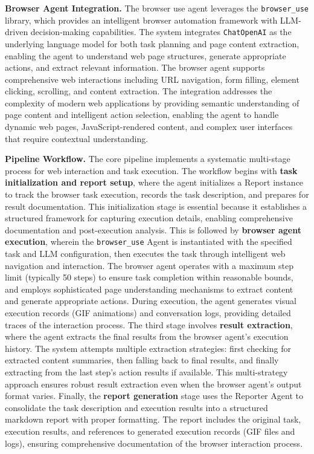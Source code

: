 \documentclass[11pt]{article}
\begin{document}
\textbf{Browser Agent Integration.} The browser use agent leverages the \texttt{browser\_use} library, which provides an intelligent browser automation framework with LLM-driven decision-making capabilities. The system integrates \texttt{ChatOpenAI} as the underlying language model for both task planning and page content extraction, enabling the agent to understand web page structures, generate appropriate actions, and extract relevant information. The browser agent supports comprehensive web interactions including URL navigation, form filling, element clicking, scrolling, and content extraction. The integration addresses the complexity of modern web applications by providing semantic understanding of page content and intelligent action selection, enabling the agent to handle dynamic web pages, JavaScript-rendered content, and complex user interfaces that require contextual understanding.

\textbf{Pipeline Workflow.} The core pipeline implements a systematic multi-stage process for web interaction and task execution. The workflow begins with \textbf{task initialization and report setup}, where the agent initializes a Report instance to track the browser task execution, records the task description, and prepares for result documentation. This initialization stage is essential because it establishes a structured framework for capturing execution details, enabling comprehensive documentation and post-execution analysis. This is followed by \textbf{browser agent execution}, wherein the \texttt{browser\_use} Agent is instantiated with the specified task and LLM configuration, then executes the task through intelligent web navigation and interaction. The browser agent operates with a maximum step limit (typically 50 steps) to ensure task completion within reasonable bounds, and employs sophisticated page understanding mechanisms to extract content and generate appropriate actions. During execution, the agent generates visual execution records (GIF animations) and conversation logs, providing detailed traces of the interaction process. The third stage involves \textbf{result extraction}, where the agent extracts the final results from the browser agent's execution history. The system attempts multiple extraction strategies: first checking for extracted content summaries, then falling back to final results, and finally extracting from the last step's action results if available. This multi-strategy approach ensures robust result extraction even when the browser agent's output format varies. Finally, the \textbf{report generation} stage uses the Reporter Agent to consolidate the task description and execution results into a structured markdown report with proper formatting. The report includes the original task, execution results, and references to generated execution records (GIF files and logs), ensuring comprehensive documentation of the browser interaction process.
\end{document}
